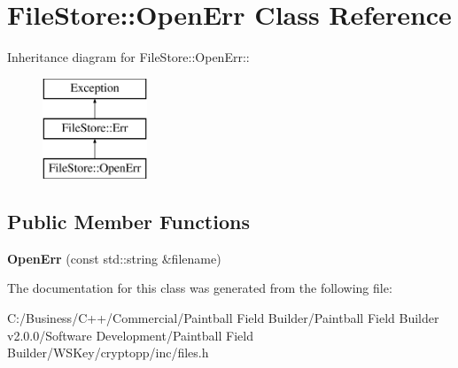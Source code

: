 \hypertarget{class_file_store_1_1_open_err}{
\section{FileStore::OpenErr Class Reference}
\label{class_file_store_1_1_open_err}
}
Inheritance diagram for FileStore::OpenErr::\begin{figure}[H]
\begin{center}
\leavevmode
\includegraphics[height=3cm]{class_file_store_1_1_open_err}
\end{center}
\end{figure}
\subsection*{Public Member Functions}
\begin{DoxyCompactItemize}
\item 
\hypertarget{class_file_store_1_1_open_err_a8996140e49885d4a5a517b373c32b462}{
{\bfseries OpenErr} (const std::string \&filename)}
\label{class_file_store_1_1_open_err_a8996140e49885d4a5a517b373c32b462}

\end{DoxyCompactItemize}


The documentation for this class was generated from the following file:\begin{DoxyCompactItemize}
\item 
C:/Business/C++/Commercial/Paintball Field Builder/Paintball Field Builder v2.0.0/Software Development/Paintball Field Builder/WSKey/cryptopp/inc/files.h\end{DoxyCompactItemize}
